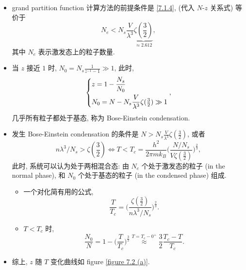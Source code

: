\begin{itemize}
	\item grand partition function 计算方法的前提条件是 \eqref{7.1.4}, (代入 $N$-$z$ 关系式) 等价于
	\begin{equation}
		N_e < N_s \frac{V}{\lambda^3} \underbrace{\zeta({\textstyle \frac{3}{2}})}_{\approx 2.612},
	\end{equation} 
	其中 $N_e$ 表示激发态上的粒子数量.
	
	\item 当 $z$ 接近 $1$ 时, $N_0 = N_s \frac{1}{z^{- 1} - 1} \gg 1$, 此时,
	\begin{equation}
		\begin{dcases}
			z = 1 - \frac{N_s}{N_0} \\
			N_0 = N - N_s \frac{V}{\lambda^3} \zeta({\textstyle \frac{3}{2}}) \gg 1
		\end{dcases},
	\end{equation}
	几乎所有粒子都处于基态, 称为 Bose-Einstein condensation.
	
	\item 发生 Bose-Einstein condensation 的条件是 $N > N_s \frac{V}{\lambda^3} \zeta(\frac{3}{2})$, 或者
	\begin{equation}
		n \lambda^3 / N_s > \zeta({\textstyle \frac{3}{2}}) \iff T < T_c = \frac{h^2}{2 \pi m k_B} \Big( \frac{N / N_s}{V \zeta(\frac{3}{2})} \Big)^{\frac{2}{3}},
	\end{equation}
	此时, 系统可以认为处于两相混合态: 由 $N_e$ 个处于激发态的粒子 (in the normal phase), 和 $N_0$ 个处于基态的粒子 (in the condensed phase) 组成.
	\begin{itemize}
		\item 一个对化简有用的公式,
		\begin{equation}
			\frac{T}{T_c} = \Big( \frac{\zeta(\frac{3}{2})}{n \lambda^3 / N_s} \Big)^{\frac{2}{3}}.
		\end{equation}
		
		\item $T < T_c$ 时,
		\begin{equation}
			\frac{N_0}{N} = 1 - \Big( \frac{T}{T_c} \Big)^{\frac{3}{2}} \overset{T = T_c - 0^+}{\approx} \frac{3}{2} \frac{T_c - T}{T_c}.
		\end{equation}
	\end{itemize}
	
	\item 综上, $z$ 随 $T$ 变化曲线如 figure \ref{figure 7.2 (a)}.
	

\end{itemize}

